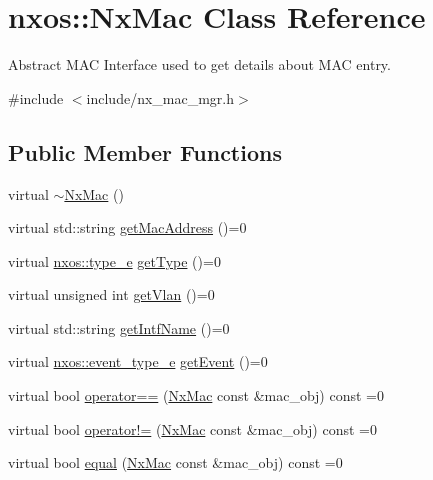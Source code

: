 \hypertarget{classnxos_1_1_nx_mac}{}\section{nxos\+:\+:Nx\+Mac Class Reference}
\label{classnxos_1_1_nx_mac}


Abstract M\+AC Interface used to get details about M\+AC entry.  




{\ttfamily \#include $<$include/nx\+\_\+mac\+\_\+mgr.\+h$>$}

\subsection*{Public Member Functions}
\begin{DoxyCompactItemize}
\item 
virtual \mbox{\hyperlink{classnxos_1_1_nx_mac_a54a2228786abb8df6429123aa39795cb}{$\sim$\+Nx\+Mac}} ()
\item 
virtual std\+::string \mbox{\hyperlink{classnxos_1_1_nx_mac_ae1510492e7d8fe257f918c74bbe6b0ea}{get\+Mac\+Address}} ()=0
\item 
virtual \mbox{\hyperlink{nx__common_8h_acfd59f63fea0b34d70c39b7e808cb5d2}{nxos\+::type\+\_\+e}} \mbox{\hyperlink{classnxos_1_1_nx_mac_a4cf7307522c86006f61a7c106843762a}{get\+Type}} ()=0
\item 
virtual unsigned int \mbox{\hyperlink{classnxos_1_1_nx_mac_ab785cecf1661f3c30c96fe952ba410f3}{get\+Vlan}} ()=0
\item 
virtual std\+::string \mbox{\hyperlink{classnxos_1_1_nx_mac_a4d29913106ccffd03fbd93fed04129eb}{get\+Intf\+Name}} ()=0
\item 
virtual \mbox{\hyperlink{nx__common_8h_af9a9040b7681199d386e94eb888018cb}{nxos\+::event\+\_\+type\+\_\+e}} \mbox{\hyperlink{classnxos_1_1_nx_mac_a78876af7dfe79a990ea9eacc6f6dd078}{get\+Event}} ()=0
\item 
virtual bool \mbox{\hyperlink{classnxos_1_1_nx_mac_ae6ebe78a6679fb460e2ed1f18c08acd0}{operator==}} (\mbox{\hyperlink{classnxos_1_1_nx_mac}{Nx\+Mac}} const \&mac\+\_\+obj) const =0
\item 
virtual bool \mbox{\hyperlink{classnxos_1_1_nx_mac_a11e241f495e5f2a00b6782b3f5416237}{operator!=}} (\mbox{\hyperlink{classnxos_1_1_nx_mac}{Nx\+Mac}} const \&mac\+\_\+obj) const =0
\item 
virtual bool \mbox{\hyperlink{classnxos_1_1_nx_mac_a9a4529b39d875b2dd54b0208d1a61c1a}{equal}} (\mbox{\hyperlink{classnxos_1_1_nx_mac}{Nx\+Mac}} const \&mac\+\_\+obj) const =0
\end{DoxyCompactItemize}


